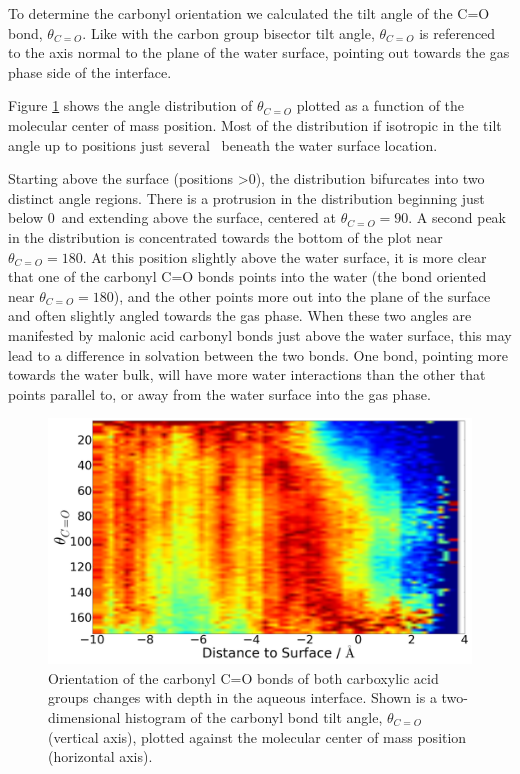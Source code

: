 To determine the carbonyl orientation we calculated the tilt angle of the C=O bond, $\theta_{C=O}$. Like with the carbon group bisector tilt angle, $\theta_{C=O}$ is referenced to the axis normal to the plane of the water surface, pointing out towards the gas phase side of the interface.

Figure \ref{fig:carbonyl-tilt} shows the angle distribution of $\theta_{C=O}$ plotted as a function of the molecular center of mass position. Most of the distribution if isotropic in the tilt angle up to positions just several \angs~beneath the water surface location.

Starting above the surface (positions >0\angs), the distribution bifurcates into two distinct angle regions. There is a protrusion in the distribution beginning just below 0\angs~and extending above the surface, centered at $\theta_{C=O}=90$\textdegree. A second peak in the distribution is concentrated towards the bottom of the plot near $\theta_{C=O}=180$\textdegree. At this position slightly above the water surface, it is more clear that one of the carbonyl C=O bonds points into the water (the bond oriented near $\theta_{C=O}=180$\textdegree), and the other points more out into the plane of the surface and often slightly angled towards the gas phase.  When these two angles are manifested by malonic acid carbonyl bonds just above the water surface, this may lead to a difference in solvation between the two bonds. One bond, pointing more towards the water bulk, will have more water interactions than the other that points parallel to, or away from the water surface into the gas phase.


\begin{figure}[h!]
	\begin{center}
		\includegraphics[scale=1.0]{images/malonic-angles/carbonyl-theta-distance.png}
		\caption{Orientation of the carbonyl C=O bonds of both carboxylic acid groups changes with depth in the aqueous interface. Shown is a two-dimensional histogram of the carbonyl bond tilt angle, $\theta_{C=O}$ (vertical axis), plotted against the molecular center of mass position (horizontal axis).}  
		\label{fig:carbonyl-tilt}
	\end{center}
\end{figure}

